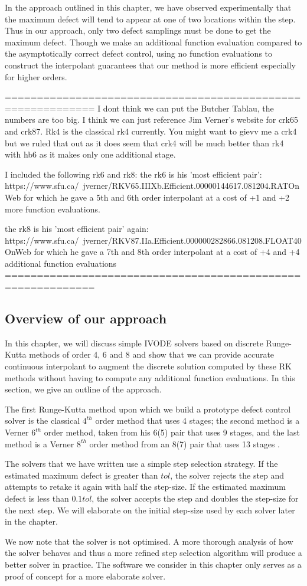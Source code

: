 In the approach outlined in this chapter, we have observed experimentally that the maximum defect will tend to appear at one of two locations within the step. Thus in our approach, only two defect samplings must be done to get the maximum defect. Though we make an additional function evaluation compared to the asymptotically correct defect control, using no function evaluations to construct the interpolant guarantees that our method is more efficient especially for higher orders.

============================================================
I dont think we can put the Butcher Tablau, the numbers are too big.
I think we can just reference Jim Verner's website for crk65 and crk87.
Rk4 is the classical rk4 currently. You might want to gievv me a crk4 but we ruled that out as it does seem that crk4 will be much better than rk4 with hb6 as it makes only one additional stage.

I included the following rk6 and rk8:
the rk6 is his 'most efficient pair': https://www.sfu.ca/~jverner/RKV65.IIIXb.Efficient.00000144617.081204.RATOnWeb for which he gave a 5th and 6th order interpolant at a cost of +1 and +2 more function evaluations.

the rk8 is his 'most efficient pair' again: https://www.sfu.ca/~jverner/RKV87.IIa.Efficient.000000282866.081208.FLOAT40OnWeb for which he gave a 7th and 8th order interpolant at a cost of +4 and +4 additional function evaluations
============================================================

\subsection{Overview of our approach}
\label{section:basic_runge_kutta}
In this chapter, we will discuss simple IVODE solvers based on discrete Runge-Kutta methods of order 4, 6 and 8 and show that we can provide accurate continuous interpolant to augment the discrete solution computed by these RK methods without having to compute any additional function evaluations. In this section, we give an outline of the approach.

The first Runge-Kutta method upon which we build a prototype defect control solver is the classical $4^{th}$ order method that uses 4 stages; the second method is a Verner $6^{th}$ order method, taken from his 6(5) pair \cite{JimVernerRepo} that uses 9 stages, and the last method is a Verner $8^{th}$ order method from an 8(7) pair that uses 13 stages \cite{MR1239829}. 

The solvers that we have written use a simple step selection strategy. If the estimated maximum defect is greater than $tol$, the solver rejects the step and attempts to retake it again with half the step-size. If the estimated maximum defect is less than $0.1tol$, the solver accepts the step and doubles the step-size for the next step. We will elaborate on the initial step-size used by each solver later in the chapter.

We now note that the solver is not optimised. A more thorough analysis of how the solver behaves and thus a more refined step selection algorithm will produce a better solver in practice. The software we consider in this chapter only serves as a proof of concept for a more elaborate solver. 